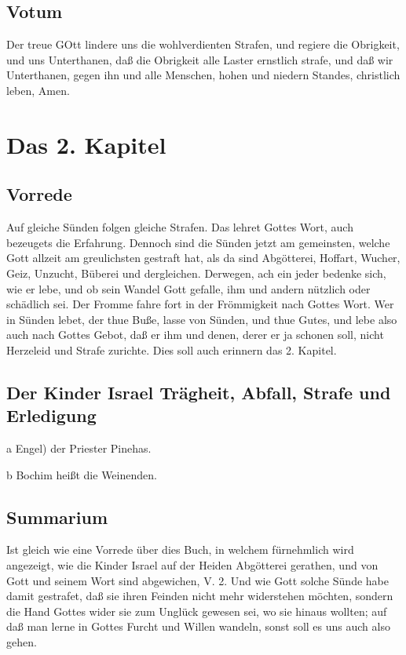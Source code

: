 \section{Votum}

Der treue GOtt lindere uns die wohlverdienten Strafen, und regiere die Obrigkeit, und uns Unterthanen, daß die Obrigkeit alle Laster ernstlich strafe, und daß wir Unterthanen, gegen ihn und alle Menschen, hohen und niedern Standes, christlich leben, Amen.

\chapter{Das 2. Kapitel}

\section{Vorrede}

Auf gleiche Sünden folgen gleiche Strafen. Das lehret Gottes Wort, auch bezeugets die Erfahrung. Dennoch sind die Sünden jetzt am gemeinsten, welche Gott allzeit am greulichsten gestraft hat, als da sind Abgötterei, Hoffart, Wucher, Geiz, Unzucht, Büberei und dergleichen. Derwegen, ach ein jeder bedenke sich, wie er lebe, und ob sein Wandel Gott gefalle, ihm und andern nützlich oder schädlich sei. Der Fromme fahre fort in der Frömmigkeit nach Gottes Wort. Wer in Sünden lebet, der thue Buße, lasse von Sünden, und thue Gutes, und lebe also auch nach Gottes Gebot, daß er ihm und denen, derer er ja schonen soll, nicht Herzeleid und Strafe zurichte. Dies soll auch erinnern das 2. Kapitel.

\section{Der Kinder Israel Trägheit, Abfall, Strafe und Erledigung}

a Engel) der Priester Pinehas.

b Bochim heißt die Weinenden.
\section{Summarium}

Ist gleich wie eine Vorrede über dies Buch, in welchem fürnehmlich wird angezeigt, wie die Kinder Israel auf der Heiden Abgötterei gerathen, und von Gott und seinem Wort sind abgewichen, V. 2. Und wie Gott solche Sünde habe damit gestrafet, daß sie ihren Feinden nicht mehr widerstehen möchten, sondern die Hand Gottes wider sie zum Unglück gewesen sei, wo sie hinaus wollten; auf daß man lerne in Gottes Furcht und Willen wandeln, sonst soll es uns auch also gehen.

